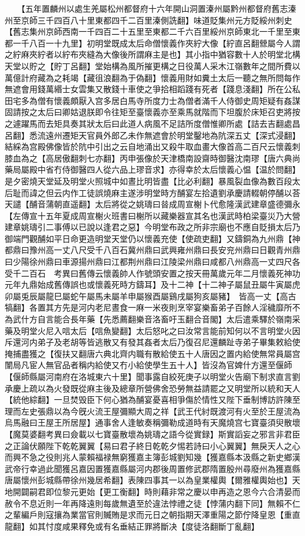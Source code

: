 　　【五年置麟州以處生羌屬松州都督府十六年開山洞置溱州屬黔州都督府舊志溱州至京師三千四百八十里東都四千二百里溱側詵翻】味道貶集州元方貶綏州刺史【舊志集州京師西南一千四百二十五里至東都二千六百里綏州京師東北一千里至東都一千八百一十九里】初明堂既成太后命僧懷義作夾紵大像【紵直呂翻檾屬今人謂之紵麻夾紵者以紵布夾縫為大像後所謂麻主是也】其小指中猶容數十人於明堂北構天堂以貯之【貯丁呂翻】堂始構為風所摧更構之日役萬人采木江嶺數年之間所費以萬億計府藏為之耗竭【藏徂浪翻為于偽翻】懷義用財如糞土太后一聽之無所問每作無遮會用錢萬緡士女雲集又散錢十車使之爭拾相蹈踐有死者【踐息淺翻】所在公私田宅多為僧有懷義頗厭入宫多居白馬寺所度力士為僧者滿千人侍御史周矩疑有姦謀固請按之太后曰卿姑退朕即令往矩至臺懷義亦至乘馬就階而下坦腹於床矩召吏將按之遽躍馬而去矩具奏其狀太后曰此道人病風不足詰所度僧惟卿所處【詰去吉翻處昌呂翻】悉流遠州遷矩天官員外郎乙未作無遮會於明堂鑿地為阬深五丈【深式浸翻】結綵為宫殿佛像皆於阬中引出之云自地涌出又殺牛取血畫大像首高二百尺云懷義刺膝血為之【高居傲翻刺七亦翻】丙申張像於天津橋南設齋時御醫沈南璆【唐六典尚藥局屬殿中省冇侍御醫四人從六品上璆音求】亦得幸於太后懷義心愠【温於問翻】是夕密燒天堂延及明堂火照城中如晝比明皆盡【比必利翻】暴風裂血像為數百段太后耻而諱之但云内作工徒誤燒麻主遂涉明堂時方酺宴左拾遺劉承慶請輟朝停酺以荅天譴【酺音蒲朝直遥翻】太后將從之姚璹曰㫺成周宣榭卜代愈隆漢武建章盛德彌永【左傳宣十五年夏成周宣榭火班書曰榭所以藏樂器宣其名也漢武時柏梁臺災乃大營建章姚璹引二事傅以已說以逢君之惡】今明堂布政之所非宗廟也不應自貶損太后乃御端門觀酺如平日命更造明堂天堂仍以懷義充使【使疏吏翻】又鑄銅為九州鼎【神都鼎曰豫州高一丈八尺受千八百石冀州鼎曰武興雍州鼎曰長安兖州鼎曰日觀青州鼎曰少陽徐州鼎曰車源揚州鼎曰江都荆州鼎曰江陵梁州鼎曰咸都八州鼎高一丈四尺各受千二百石　考異曰舊傳云懷義帥人作號頭安置之按天冊萬歲元年二月懷義死神功元年九鼎始成舊傳誤也或懷義死時方鑄耳】及十二神【十二神子屬鼠丑屬牛寅屬虎卯屬兎辰屬龍巳屬蛇午屬馬未屬羊申屬猴酉屬鷄戌屬狗亥屬豬】　皆高一丈【高古犒翻】各置其方先是河内老尼晝食一麻一米夜則烹宰宴樂畜弟子百餘人淫穢靡所不為武什方自言能合長年藥【先悉薦翻樂音洛畜吁玉翻合音閣】太后遣乘驛於嶺南采藥及明堂火尼入唁太后【唁魚變翻】太后怒叱之曰汝常言能前知何以不言明堂火因斥還河内弟子及老胡等皆逃散又有發其姦者太后乃復召尼還麟趾寺弟子畢集敕給使掩捕盡獲之【復扶又翻唐六典北齊内職有散給使五十人唐因之置内給使無常員屬宫闈局凡宦人無官品者稱内給使又冇小給使學生五十人】皆沒為官婢什方還至偃師【偃師縣屬河南府在洛城東六十里】聞事露自絞死庚子以明堂火告廟下制求直言劉承慶上疏以為火發既從麻主後及總章所營佛舍恐勞無益請罷之又明堂所以統和天人【統他綜翻】一旦焚毁臣下何心猶為酺宴憂喜相爭傷於情性又陛下垂制博訪許陳至理而左史張鼎以為今旣火流王屋彌顯大周之祥【武王代紂既渡河有火至於王屋流為烏馬融曰王屋王所居屋】通事舍人逢敏奏稱彌勒成道時有天魔燒宫七寶臺須臾散壞【魔莫婆翻考異曰僉載以七寶臺散壞為姚璹之語今從實録】斯實謟妄之邪言非君臣之正論伏願陛下乾乾翼翼【易曰君子終日乾乾夕惕若詩曰小心翼翼】無戾天人之心而興不急之役則兆人蒙賴福禄無窮獲嘉主簿彭城劉知幾【獲嘉縣本汲縣之新史鄉漢武帝行幸過此聞獲呂嘉因置獲嘉縣屬河内郡後周置修武郡隋置殷州尋廢州為獲嘉縣唐屬懷州彭城縣帶徐州幾居希翻】表陳四事其一以為皇業權輿【爾雅權輿始也】天地開闢嗣君即位黎元更始【更工衡翻】時則藉非常之慶以申再造之恩今六合清晏而赦令不息近則一年再降遠則每歲無遺至於違法悖禮之徒【悖蒲内翻下同】無賴不仁之輩編戶則寇攘為業當官則贓賄是求而元日之朝指期天澤重陽之節佇降皇恩【重直龍翻】如其忖度咸果釋免或有名垂結正罪將斷决【度徒洛翻斷丁亂翻】